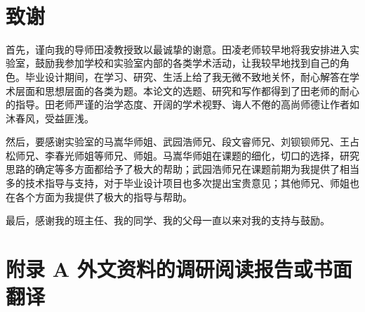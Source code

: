 \documentclass[12pt,a4paper]{article}
\newcommand{\wuhao}{\fontsize{10.5pt}{\baselineskip}\selectfont}
\begin{document}
\newpage	
{}
\listoftables

\newpage

\wuhao %
\setlength{\baselineskip}{17pt} %
\renewcommand\refname{参考文献}\

	

\newpage
\section*{致\quad 谢}


\setlength{\baselineskip}{20pt} %
首先，谨向我的导师田凌教授致以最诚挚的谢意。田凌老师较早地将我安排进入实验室，鼓励我参加学校和实验室内部的各类学术活动，让我较早地找到自己的角色。毕业设计期间，在学习、研究、生活上给了我无微不致地关怀，耐心解答在学术层面和思想层面的各类为题。本论文的选题、研究和写作都得到了田老师的耐心的指导。田老师严谨的治学态度、开阔的学术视野、诲人不倦的高尚师德让作者如沐春风，受益匪浅。

然后，要感谢实验室的马嵩华师姐、武园浩师兄、段文睿师兄、刘钡钡师兄、王占松师兄、李春光师姐等师兄、师姐。马嵩华师姐在课题的细化，切口的选择，研究思路的确定等多方面都给予了极大的帮助；武园浩师兄在课题前期为我提供了相当多的技术指导与支持，对于毕业设计项目也多次提出宝贵意见；其他师兄、师姐也在各个方面为我提供了极大的指导与帮助。

最后，感谢我的班主任、我的同学、我的父母一直以来对我的支持与鼓励。

\newpage

\section*{附录 A 外文资料的调研阅读报告或书面翻译}
 

\end{document}
